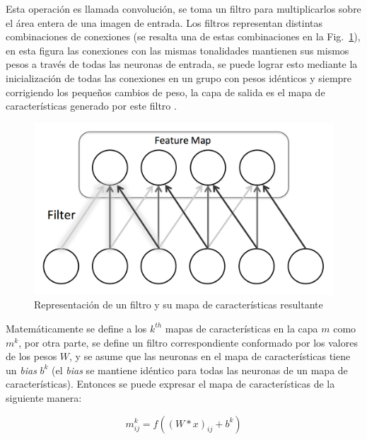     Esta operación es llamada convolución, se toma un filtro para multiplicarlos sobre el área entera de una imagen de entrada. Los filtros representan distintas combinaciones de conexiones (se resalta una de estas combinaciones en la Fig.~\ref{fig:conv_neuron}), en esta figura las conexiones con las mismas tonalidades mantienen sus mismos pesos a través de todas las neuronas de entrada, se puede lograr esto mediante la inicialización de todas las conexiones en un grupo con pesos idénticos y siempre corrigiendo los pequeños cambios de peso, la capa de salida es el mapa de características generado por este filtro \cite{dlBook}.
    \begin{figure}[htp]
        \centering
        \includegraphics[scale=0.3]{chapter3/conv_neuron.png}
        \caption{Representación de un filtro y su mapa de características resultante}
        \label{fig:conv_neuron}
    \end{figure}

    Matemáticamente se define a los $k^{th}$ mapas de características en la capa $m$ como $m^k$, por otra parte, se define un filtro correspondiente conformado por los valores de los pesos $W$, y se asume que las neuronas en el mapa de características tiene un \textit{bias} $b^k$ (el \textit{bias} se mantiene idéntico para todas las neuronas de un mapa de características). Entonces se puede expresar el mapa de características de la siguiente manera:

    \begin{equation}
		m^k_{ij}=f((W*x)_{ij}+b^k)
	\end{equation}
	
